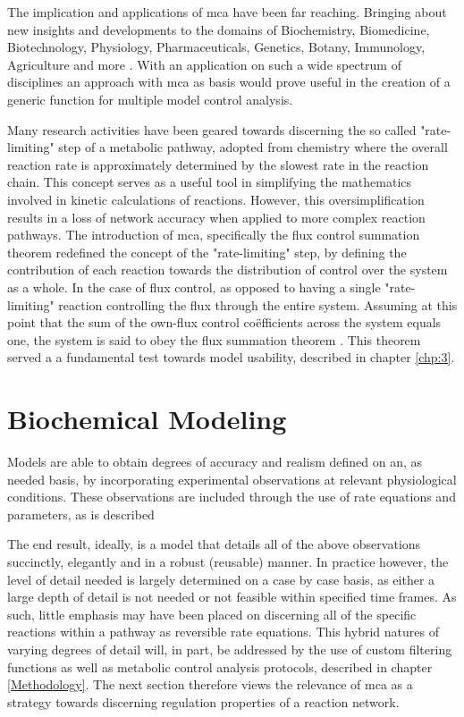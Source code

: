 The implication and applications of \gls{mca} have been far reaching. Bringing about new insights and developments to the domains of Biochemistry, Biomedicine, Biotechnology, Physiology, Pharmaceuticals, Genetics, Botany, Immunology, Agriculture and more \citep{Kacser1981, Sorribas1995, Holms1996, Cornish1999, Boren2002, Cascante2002, Olivier2004, Weselake2008}. With an application on such a wide spectrum of disciplines an approach with \gls{mca} as basis would prove useful in the creation of a generic function for multiple model control analysis.  

Many research activities have been geared towards discerning the so called "rate-limiting" step of a metabolic pathway, adopted from chemistry where the overall reaction rate is approximately determined by the slowest rate in the reaction chain. This concept serves as a useful tool in simplifying the mathematics involved in kinetic calculations of reactions. However, this oversimplification results in a loss of network accuracy when applied to more complex reaction pathways. The introduction of \gls{mca}, specifically the flux control summation theorem redefined the concept of the "rate-limiting" step, by defining the contribution of each reaction towards the distribution of control over the system as a whole. In the case of flux control, as opposed to having a single "rate-limiting" reaction controlling the flux through the entire system. Assuming at this point that the sum of the own-flux control co\"efficients across the system equals one, the system is said to obey the flux summation theorem \citep{Fell1992,Hofmeyr2001,Kacser1995,Ehlde1997}. This theorem served a a fundamental test towards model usability, described in chapter \ref{chp:3}.

\section{Biochemical Modeling}
Models are able to obtain degrees of accuracy and realism defined on an, as needed basis, by incorporating experimental observations at relevant physiological conditions. These observations are included through the use of rate equations and parameters, as is described 

The end result, ideally, is a model that details all of the above observations succinctly, elegantly and in a robust (reusable) manner. In practice however, the level of detail needed is largely determined on a case by case basis, as either a large depth of detail is not needed or not feasible within specified time frames. As such, little emphasis may have been placed on discerning all of the specific reactions within a pathway as reversible rate equations. This hybrid natures of varying degrees of detail will, in part, be addressed by the use of custom filtering functions as well as metabolic control analysis protocols, described in chapter \ref{Methodology}. The next section therefore views the relevance of \gls{mca} as a strategy towards discerning regulation properties of a reaction network.
